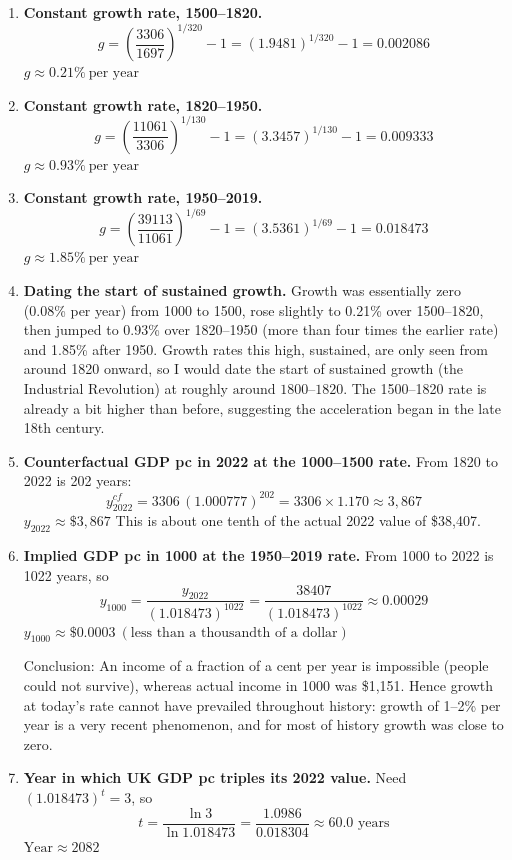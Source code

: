 \documentclass[11pt]{article}
\newcommand{\ans}[1]{$\boxed{#1}$}
\begin{document}
\begin{enumerate}[label=\textbf{\arabic*.}, leftmargin=*]
\item \textbf{Constant growth rate, 1500--1820.}
\[
  g = \left(\frac{3306}{1697}\right)^{1/320} - 1 = (1.9481)^{1/320}-1 = 0.002086
\]
\ans{g \approx 0.21\%\ \text{per year}}

\item \textbf{Constant growth rate, 1820--1950.}
\[
  g = \left(\frac{11061}{3306}\right)^{1/130} - 1 = (3.3457)^{1/130}-1 = 0.009333
\]
\ans{g \approx 0.93\%\ \text{per year}}

\item \textbf{Constant growth rate, 1950--2019.}
\[
  g = \left(\frac{39113}{11061}\right)^{1/69} - 1 = (3.5361)^{1/69}-1 = 0.018473
\]
\ans{g \approx 1.85\%\ \text{per year}}

\item \textbf{Dating the start of sustained growth.}
Growth was essentially zero (0.08\% per year) from 1000 to 1500, rose slightly to 0.21\% over 1500--1820, then jumped to 0.93\% over 1820--1950 (more than four times the earlier rate) and 1.85\% after 1950. Growth rates this high, sustained, are only seen from around 1820 onward, so I would date the start of sustained growth (the Industrial Revolution) at roughly \ans{\text{around 1800--1820}}. The 1500--1820 rate is already a bit higher than before, suggesting the acceleration began in the late 18th century.

\item \textbf{Counterfactual GDP pc in 2022 at the 1000--1500 rate.}
From 1820 to 2022 is 202 years:
\[
  y_{2022}^{cf} = 3306\,(1.000777)^{202} = 3306 \times 1.170 \approx 3{,}867
\]
\ans{y_{2022} \approx \$3{,}867}
This is about one tenth of the actual 2022 value of \$38,407.

\item \textbf{Implied GDP pc in 1000 at the 1950--2019 rate.}
From 1000 to 2022 is 1022 years, so
\[
  y_{1000} = \frac{y_{2022}}{(1.018473)^{1022}} = \frac{38407}{(1.018473)^{1022}} \approx 0.00029
\]
\ans{y_{1000} \approx \$0.0003 \ (\text{less than a thousandth of a dollar})}

Conclusion: An income of a fraction of a cent per year is impossible (people could not survive), whereas actual income in 1000 was \$1,151. Hence growth at today's rate cannot have prevailed throughout history: growth of 1--2\% per year is a very recent phenomenon, and for most of history growth was close to zero.

\item \textbf{Year in which UK GDP pc triples its 2022 value.}
Need $(1.018473)^t = 3$, so
\[
  t = \frac{\ln 3}{\ln 1.018473} = \frac{1.0986}{0.018304} \approx 60.0 \text{ years}
\]
\ans{\text{Year} \approx 2082}


\end{enumerate}
\end{document}
